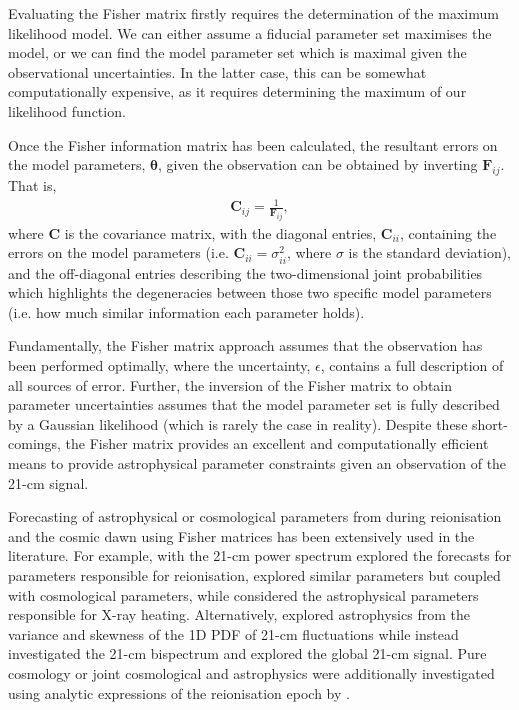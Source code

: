 Evaluating the Fisher matrix firstly requires the determination of the maximum likelihood model. We can either assume a fiducial parameter set maximises the model, or we can find the model parameter set which is maximal given the observational uncertainties. In the latter case, this can be somewhat computationally expensive, as it requires determining the maximum of our likelihood function.

Once the Fisher information matrix has been calculated, the resultant errors on the model parameters, $\mathbf{\theta}$, given the observation can be obtained by inverting $\mathbf{F}_{ij}$. That is,
\begin{eqnarray}
\mathbf{C}_{ij} = \frac{1}{\mathbf{F}_{ij}},
\end{eqnarray}
where $\mathbf{C}$ is the covariance matrix, with the diagonal entries, $\mathbf{C}_{ii}$, containing the errors on the model parameters (i.e. $\mathbf{C}_{ii} = \sigma^{2}_{ii}$, where $\sigma$ is the standard deviation), and the off-diagonal entries describing the two-dimensional joint probabilities which highlights the degeneracies between those two specific model parameters (i.e. how much similar information each parameter holds).

Fundamentally, the Fisher matrix approach assumes that the observation has been performed optimally, where the uncertainty, $\epsilon$, contains a full description of all sources of error. Further, the inversion of the Fisher matrix to obtain parameter uncertainties assumes that the model parameter set is fully described by a Gaussian likelihood (which is rarely the case in reality). Despite these short-comings, the Fisher matrix provides an excellent and computationally efficient means to provide astrophysical parameter constraints given an observation of the 21-cm signal.

Forecasting of astrophysical or cosmological parameters from during reionisation and the cosmic dawn using Fisher matrices has been extensively used in the literature. For example, with the 21-cm power spectrum \cite{Pober:2014} explored the forecasts for parameters responsible for reionisation, \cite{Liu:2016b} explored similar parameters but coupled with cosmological parameters, while \cite{Ewall-Wice:2016} considered the astrophysical parameters responsible for X-ray heating. Alternatively, \cite{Kubota:2016} explored astrophysics from the variance and skewness of the 1D PDF of 21-cm fluctuations while \cite{Shimabukuro:2017} instead investigated the 21-cm bispectrum and \cite{Pritchard:2010a} explored the global 21-cm signal. Pure cosmology or joint cosmological and astrophysics were additionally investigated using analytic expressions of the reionisation epoch by \cite{McQuinn:2006,Mao:2008,Barger:2009,Visbal:2009,Liu:2016b}.

